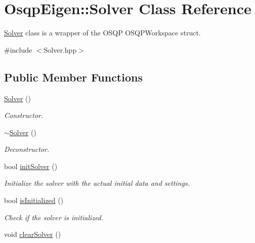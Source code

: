\section{Osqp\+Eigen\+:\+:Solver Class Reference}
\label{classOsqpEigen_1_1Solver}


\mbox{\hyperlink{classOsqpEigen_1_1Solver}{Solver}} class is a wrapper of the O\+S\+QP O\+S\+Q\+P\+Workspace struct.  




{\ttfamily \#include $<$Solver.\+hpp$>$}

\subsection*{Public Member Functions}
\begin{DoxyCompactItemize}
\item 
\mbox{\label{classOsqpEigen_1_1Solver_a4de5403060c8798d0e138aaff0158cf9}} 
\mbox{\hyperlink{classOsqpEigen_1_1Solver_a4de5403060c8798d0e138aaff0158cf9}{Solver}} ()
\begin{DoxyCompactList}\small\item\em Constructor. \end{DoxyCompactList}\item 
\mbox{\label{classOsqpEigen_1_1Solver_a9539d922fa2e901a608155fb8e9385a5}} 
\mbox{\hyperlink{classOsqpEigen_1_1Solver_a9539d922fa2e901a608155fb8e9385a5}{$\sim$\+Solver}} ()
\begin{DoxyCompactList}\small\item\em Deconstructor. \end{DoxyCompactList}\item 
bool \mbox{\hyperlink{classOsqpEigen_1_1Solver_a8487090a685d7653ea4011971c2f21f7}{init\+Solver}} ()
\begin{DoxyCompactList}\small\item\em Initialize the solver with the actual initial data and settings. \end{DoxyCompactList}\item 
bool \mbox{\hyperlink{classOsqpEigen_1_1Solver_a05c8a18a9d9ed9a74fc0dc26af711348}{is\+Initialized}} ()
\begin{DoxyCompactList}\small\item\em Check if the solver is initialized. \end{DoxyCompactList}\item 
\mbox{\label{classOsqpEigen_1_1Solver_a34214395818d23bc1552fc9bbcf0f47b}} 
void \mbox{\hyperlink{classOsqpEigen_1_1Solver_a34214395818d23bc1552fc9bbcf0f47b}{clear\+Solver}} ()

\end{DoxyCompactItemize}
